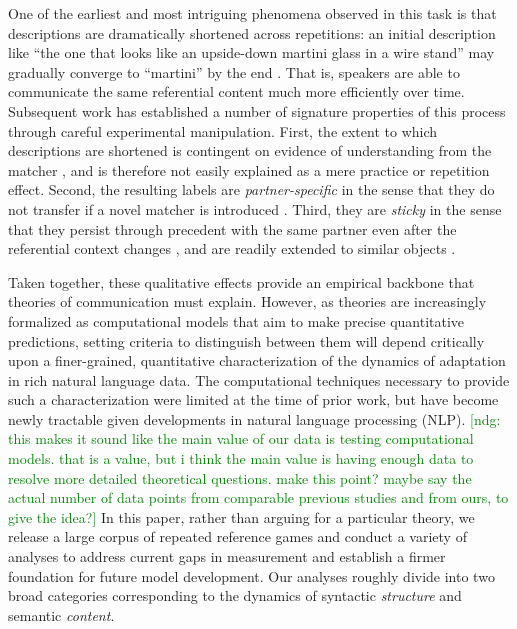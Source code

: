 \documentclass[alpha-refs]{wiley-article}
\newcommand{\ndg}[1]{\textcolor{green}{[ndg: #1]}}
\begin{document}
One of the earliest and most intriguing phenomena observed in this task is that descriptions are dramatically shortened across repetitions: an initial description like ``the one that looks like an upside-down martini glass in a wire stand'' may gradually converge to ``martini'' by the end  \citep{KraussWeinheimer64_ReferencePhrases}. 
That is, speakers are able to communicate the same referential content much more efficiently over time.
Subsequent work has established a number of signature properties of this process through careful experimental manipulation.
First, the extent to which descriptions are shortened is contingent on evidence of understanding from the matcher \citep{KraussWeinheimer66_Tangrams,KraussEtAl77_AudioVisualBackChannel,HupetChantraine92_CollaborationOrRepitition}, and is therefore not easily explained as a mere practice or repetition effect.
Second, the resulting labels are \emph{partner-specific} in the sense that they do not transfer if a novel matcher is introduced \citep{WilkesGibbsClark92_CoordinatingBeliefs,MetzingBrennan03_PartnerSpecificPacts,brennan_partner-specific_2009}.
Third, they are \emph{sticky} in the sense that they persist through precedent with the same partner even after the referential context changes \citep{BrennanClark96_ConceptualPactsConversation}, and are readily extended to similar objects \citep{MarkmanMakin98_ReferentialCommunicationCategory}.

Taken together, these qualitative effects provide an empirical backbone that theories of communication must explain. %
However, as theories are increasingly formalized as computational models that aim to make precise quantitative predictions, setting criteria to distinguish between them will depend critically upon a finer-grained, quantitative characterization of the dynamics of adaptation in rich natural language data.
The computational techniques necessary to provide such a characterization were limited at the time of prior work, but have become newly tractable given developments in natural language processing (NLP).
\ndg{this makes it sound like the main value of our data is testing computational models. that is a value, but i think the main value is having enough data to resolve more detailed theoretical questions. make this point? maybe say the actual number of data points from comparable previous studies and from ours, to give the idea?}
In this paper, rather than arguing for a particular theory, we release a large corpus of repeated reference games and conduct a variety of analyses to address current gaps in measurement and establish a firmer foundation for future model development.
Our analyses roughly divide into two broad categories corresponding to the dynamics of syntactic \emph{structure} and semantic \emph{content}.
\end{document}
